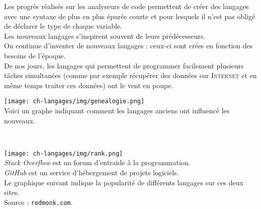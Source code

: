 Les progrès réalisés sur les analyseurs de code permettent de créer des langages avec une syntaxe de plus en plus épurée courte et pour lesquels il n'est pas obligé de déclarer le type de chaque variable.\\
Les nouveaux langages s'inspirent souvent de leurs prédécesseurs.\\
    
On continue d'inventer de nouveaux langages : ceux-ci sont crées en fonction des besoins de l'époque.\\
De nos jours, les langages qui permettent de programmer facilement plusieurs tâches simultanées (comme par exemple récupérer des données sur \textsc{Internet} et en même temps traiter ces données) ont le vent en poupe.

\begin{center}
    \texttt{[image: ch-langages/img/genealogie.png]}\\ \scriptsize   Voici un graphe indiquant comment les langages anciens ont influencé les nouveaux.\\
\end{center}
\ \\[3em]



\begin{center}
    \texttt{[image: ch-langages/img/rank.png]}\\ \scriptsize    \textit{Stack Overflow} est un forum d'entraide à la programmation.\\ \textit{GitHub} est un service d'hébergement de projets logiciels.\\
    Le graphique suivant indique la popularité de différents langages sur ces deux sites.\\
    Source : \texttt{redmonk.com}.
\end{center}

